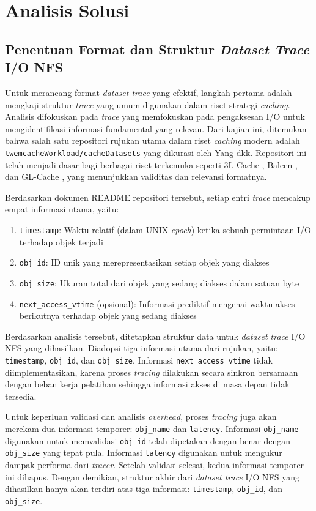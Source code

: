 \section{Analisis Solusi}

\subsection{Penentuan Format dan Struktur \textit{Dataset Trace} I/O NFS}
Untuk merancang format \textit{dataset trace} yang efektif, langkah pertama adalah mengkaji struktur \textit{trace} yang umum digunakan dalam riset strategi \textit{caching}. Analisis difokuskan pada \textit{trace} yang memfokuskan pada pengaksesan I/O untuk mengidentifikasi informasi fundamental yang relevan. Dari kajian ini, ditemukan bahwa salah satu repositori rujukan utama dalam riset \textit{caching} modern adalah \texttt{twemcacheWorkload/cacheDatasets} yang dikurasi oleh Yang dkk. Repositori ini telah menjadi dasar bagi berbagai riset terkemuka seperti 3L-Cache \parencite{3L-Cache}, Baleen \parencite{Baleen}, dan GL-Cache \parencite{GL-Cache}, yang menunjukkan validitas dan relevansi formatnya.

Berdasarkan dokumen README repositori tersebut, setiap entri \textit{trace} mencakup empat informasi utama, yaitu:
\begin{enumerate}
    \item \texttt{timestamp}: Waktu relatif (dalam UNIX \textit{epoch}) ketika sebuah permintaan I/O terhadap objek terjadi
    \item \texttt{obj\_id}: ID unik yang merepresentasikan setiap objek yang diakses
    \item \texttt{obj\_size}: Ukuran total dari objek yang sedang diakses dalam satuan byte
    \item \texttt{next\_access\_vtime} (opsional): Informasi prediktif mengenai waktu akses berikutnya terhadap objek yang sedang diakses
\end{enumerate}

Berdasarkan analisis tersebut, ditetapkan struktur data untuk \textit{dataset trace} I/O NFS yang dihasilkan. Diadopsi tiga informasi utama dari rujukan, yaitu: \texttt{timestamp}, \texttt{obj\_id}, dan \texttt{obj\_size}. Informasi \texttt{next\_access\_vtime} tidak diimplementasikan, karena proses \textit{tracing} dilakukan secara sinkron bersamaan dengan beban kerja pelatihan sehingga informasi akses di masa depan tidak tersedia.

Untuk keperluan validasi dan analisis \textit{overhead}, proses \textit{tracing} juga akan merekam dua informasi temporer: \texttt{obj\_name} dan \texttt{latency}. Informasi \texttt{obj\_name} digunakan untuk memvalidasi \texttt{obj\_id} telah dipetakan dengan benar dengan \texttt{obj\_size} yang tepat pula. Informasi \texttt{latency} digunakan untuk mengukur dampak performa dari \textit{tracer}. Setelah validasi selesai, kedua informasi temporer ini dihapus. Dengan demikian, struktur akhir dari \textit{dataset trace} I/O NFS yang dihasilkan hanya akan terdiri atas tiga informasi: \texttt{timestamp}, \texttt{obj\_id}, dan \texttt{obj\_size}.

